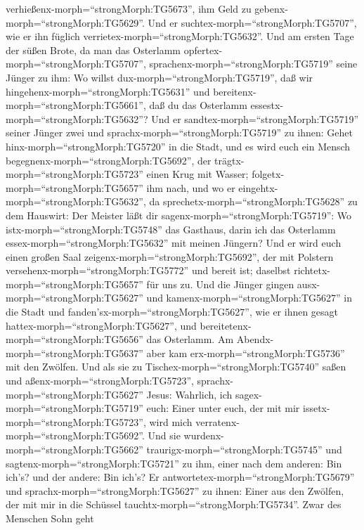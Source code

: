 verhießenx-morph=``strongMorph:TG5673'', ihm Geld zu
gebenx-morph=``strongMorph:TG5629''. Und er
suchtex-morph=``strongMorph:TG5707'', wie er ihn füglich
verrietex-morph=``strongMorph:TG5632''.  Und am ersten Tage
der süßen Brote, da man das Osterlamm
opfertex-morph=``strongMorph:TG5707'',
sprachenx-morph=``strongMorph:TG5719'' seine Jünger zu ihm: Wo willst
dux-morph=``strongMorph:TG5719'', daß wir
hingehenx-morph=``strongMorph:TG5631'' und
bereitenx-morph=``strongMorph:TG5661'', daß du das Osterlamm
essestx-morph=``strongMorph:TG5632''?  Und er
sandtex-morph=``strongMorph:TG5719'' seiner Jünger zwei und
sprachx-morph=``strongMorph:TG5719'' zu ihnen: Gehet
hinx-morph=``strongMorph:TG5720'' in die Stadt, und es wird euch ein
Mensch begegnenx-morph=``strongMorph:TG5692'', der
trägtx-morph=``strongMorph:TG5723'' einen Krug mit Wasser;
folgetx-morph=``strongMorph:TG5657'' ihm nach,  und wo er
eingehtx-morph=``strongMorph:TG5632'', da
sprechetx-morph=``strongMorph:TG5628'' zu dem Hauswirt: Der Meister läßt
dir sagenx-morph=``strongMorph:TG5719'': Wo
istx-morph=``strongMorph:TG5748'' das Gasthaus, darin ich das Osterlamm
essex-morph=``strongMorph:TG5632'' mit meinen Jüngern?  Und
er wird euch einen großen Saal zeigenx-morph=``strongMorph:TG5692'', der
mit Polstern versehenx-morph=``strongMorph:TG5772'' und bereit ist;
daselbst richtetx-morph=``strongMorph:TG5657'' für uns zu. 
Und die Jünger gingen ausx-morph=``strongMorph:TG5627'' und
kamenx-morph=``strongMorph:TG5627'' in die Stadt und
fanden'sx-morph=``strongMorph:TG5627'', wie er ihnen gesagt
hattex-morph=``strongMorph:TG5627'', und
bereitetenx-morph=``strongMorph:TG5656'' das Osterlamm.  Am
Abendx-morph=``strongMorph:TG5637'' aber kam
erx-morph=``strongMorph:TG5736'' mit den Zwölfen.  Und als
sie zu Tischex-morph=``strongMorph:TG5740'' saßen und
aßenx-morph=``strongMorph:TG5723'', sprachx-morph=``strongMorph:TG5627''
Jesus: Wahrlich, ich sagex-morph=``strongMorph:TG5719'' euch: Einer
unter euch, der mit mir issetx-morph=``strongMorph:TG5723'', wird mich
verratenx-morph=``strongMorph:TG5692''.  Und sie
wurdenx-morph=``strongMorph:TG5662''
traurigx-morph=``strongMorph:TG5745'' und
sagtenx-morph=``strongMorph:TG5721'' zu ihm, einer nach dem anderen: Bin
ich's? und der andere: Bin ich's?  Er
antwortetex-morph=``strongMorph:TG5679'' und
sprachx-morph=``strongMorph:TG5627'' zu ihnen: Einer aus den Zwölfen,
der mit mir in die Schüssel tauchtx-morph=``strongMorph:TG5734''.
 Zwar des Menschen Sohn geht
